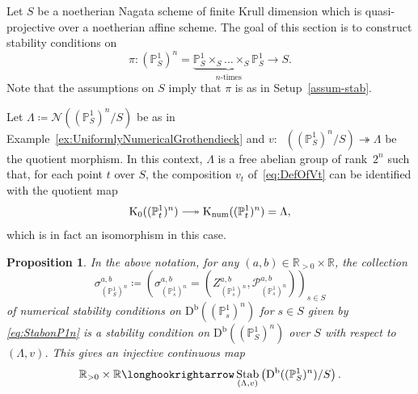 \documentclass[11pt, reqno]{amsart}
\numberwithin{equation}{section}
\theoremstyle{plain}
\newtheorem{proposition}[theorem]{Proposition}
\theoremstyle{remark}
\theoremstyle{definition}
\theoremstyle{italicsname}
\newcommand{\Db}{\mathrm{D^b}}
\newcommand{\num}{\mathrm{num}}
\DeclareMathOperator{\Knum}{\rK_{\num}}
\DeclareMathOperator{\Stab}{Stab}
\newcommand{\cN}{\mathcal{N}}
\newcommand{\cP}{\mathscr{P}}
\newcommand{\rK}{\mathrm{K}}
\def\RR{\ensuremath{\mathbb{R}}}
\def\PP{\ensuremath{\mathbb{P}}}
\DeclareRobustCommand\longtwoheadrightarrow
{\relbar\joinrel\twoheadrightarrow}
\begin{document}
Let $S$ be a noetherian Nagata scheme of finite Krull dimension which is quasi-projective over a noetherian affine scheme. 
The goal of this section is to construct stability conditions on
\[
\pi \colon (\PP^1_S)^n=\underbrace{\PP^1_S\times_S\dots\times_S\PP^1_S}_{n\text{-times}}\longrightarrow S.
\]
Note that the assumptions on $S$ imply that $\pi$ is as in Setup~\ref{assum-stab}.

Let $\Lambda\coloneqq\cN((\PP^1_S)^n/S)$ be as in Example~\ref{ex:UniformlyNumericalGrothendieck} and $v\colon\Knum((\PP^1_S)^n/S)\twoheadrightarrow\Lambda$ be the quotient morphism. 
In this context, $\Lambda$ is a free abelian group of rank~$2^n$ such that, for each point $t$ over $S$, the composition $v_t$ of~\eqref{eq:DefOfVt} can be identified with the quotient map
\[
\rK_0((\PP^1_t)^n)\longtwoheadrightarrow\Knum((\PP^1_t)^n)=\Lambda, 
\]
which is in fact an isomorphism in this case. 

\begin{proposition}\label{prop:AlgebraicP1nFamily}
In the above notation, for any $(a,b)\in\RR_{>0}\times\RR$, the collection 
\[
{\sigma}^{a,b}_{(\PP^1_S)^n}\coloneqq\left(\sigma_{(\PP^1_s)^n}^{a,b}=\left(Z^{a,b}_{(\PP^1_s)^n},\cP_{(\PP^1_s)^n}^{a,b}\right)\right)_{s\in S}
\]
of numerical stability conditions on $\Db((\PP^1_s)^n)$ for $s\in S$ given by \eqref{eq:StabonP1n}  is a stability condition on $\Db((\PP^1_S)^n)$ over $S$ with respect to $(\Lambda,v)$.
This gives an injective continuous map
\[
\RR_{>0}\times\RR\longhookrightarrow\Stab_{(\Lambda,v)}\left(\Db((\PP^1_S)^n)/S\right).
\]
\end{proposition}
\end{document}
